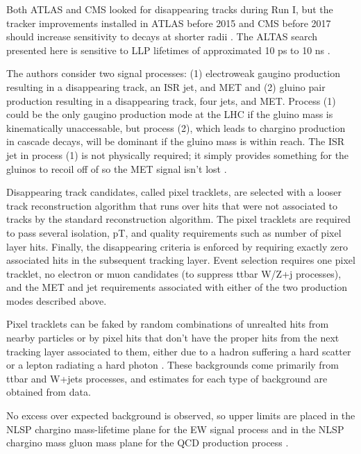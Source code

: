\documentclass[12pt]{article}
\begin{document}
    Both ATLAS and CMS looked for disappearing tracks during Run I, but the tracker improvements installed in ATLAS before 2015 and CMS before 2017 should increase sensitivity to decays at shorter radii . The ALTAS search presented here is sensitive to LLP lifetimes of approximated 10 ps to 10 ns .

    The authors consider two signal processes: (1) electroweak gaugino production resulting in a disappearing track, an ISR jet, and MET and (2) gluino pair production resulting in a disappearing track, four jets, and MET. Process (1) could be the only gaugino production mode at the LHC if the gluino mass is kinematically unaccessable, but process (2), which leads to chargino production in cascade decays, will be dominant if the gluino mass is within reach. The ISR jet in process (1) is not physically required; it simply provides something for the gluinos to recoil off of so the MET signal isn't lost .

    Disappearing track candidates, called pixel tracklets, are selected with a looser track reconstruction algorithm that runs over hits that were not associated to tracks by the standard reconstruction algorithm. The pixel tracklets are required to pass several isolation, pT, and quality requirements such as number of pixel layer hits. Finally, the disappearing criteria is enforced by requiring exactly zero associated hits in the subsequent tracking layer. Event selection requires one pixel tracklet, no electron or muon candidates (to suppress ttbar W/Z+j processes), and the MET and jet requirements associated with either of the two production modes described above.
    
    Pixel tracklets can be faked by random combinations of unrealted hits from nearby particles or by pixel hits that don't have the proper hits from the next tracking layer associated to them, either due to a hadron suffering a hard scatter or a lepton radiating a hard photon . These backgrounds come primarily from ttbar and W+jets processes, and estimates for each type of background are obtained from data. 

    No excess over expected background is observed, so upper limits are placed in the NLSP chargino mass-lifetime plane for the EW signal process and in the NLSP chargino mass gluon mass plane for the QCD production process . 
\end{document}
